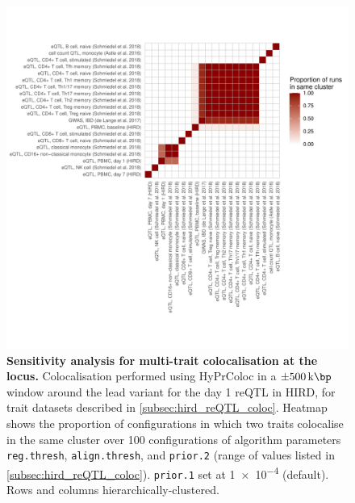 \begin{figure}
    \centering
    \includegraphics[width=1.0\textwidth,page=1]{mainmatter/figures/chapter_03/perform_coloc.gene_ENSG00000138031.sensitivityPlot_custom.pdf}
    \caption{
        \textbf{Sensitivity analysis for multi-trait colocalisation at the  locus.}
        Colocalisation performed using {HyPrColoc} \autocite{foley2019FastEfficientColocalization} in a $\pm \SI{500}{\kilo\bp}$ window around the lead variant for the day 1  \gls{reQTL} in \gls{HIRD}, for trait datasets described in \cref{subsec:hird_reQTL_coloc}.
        Heatmap shows the proportion of configurations in which two traits colocalise in the same cluster over 100 configurations of algorithm parameters
        \texttt{reg.thresh}, \texttt{align.thresh}, and \texttt{prior.2} (range of values listed in \cref{subsec:hird_reQTL_coloc}).
        \texttt{prior.1} set at \num{1e-4} (default).
        Rows and columns hierarchically-clustered.
    }
    \label{fig:hird_reQTL_coloc_ADCY3_sensitivityPlotCustom}
\end{figure}

